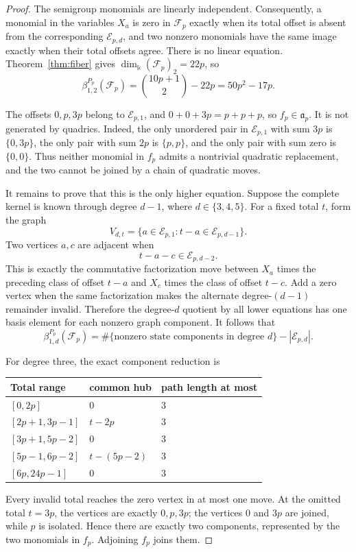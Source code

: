 \documentclass[11pt]{article}
\theoremstyle{definition}
\theoremstyle{remark}
\newcommand{\kfield}{\Bbbk}
\begin{document}
\begin{proof}
The semigroup monomials are linearly independent. Consequently, a monomial in the variables
\(X_a\) is zero in \(\mathcal F_p\) exactly when its total offset is absent from the corresponding
\(\mathcal E_{p,d}\), and two nonzero monomials have the same image exactly when their total
offsets agree. There is no linear equation. Theorem~\ref{thm:fiber} gives
\(\dim_{\kfield}(\mathcal F_p)_2=22p\), so
\begin{equation}
\beta^{P_p}_{1,2}(\mathcal F_p)
=\binom{10p+1}{2}-22p=50p^2-17p.\label{eq:quadratic-count}
\end{equation}

The offsets \(0,p,3p\) belong to \(\mathcal E_{p,1}\), and
\(0+0+3p=p+p+p\), so \(f_p\in\mathfrak a_p\). It is not generated by quadrics. Indeed, the
only unordered pair in \(\mathcal E_{p,1}\) with sum \(3p\) is \(\{0,3p\}\), the only pair with
sum \(2p\) is \(\{p,p\}\), and the only pair with sum zero is \(\{0,0\}\). Thus neither
monomial in \(f_p\) admits a nontrivial quadratic replacement, and the two cannot be joined by a
chain of quadratic moves.

It remains to prove that this is the only higher equation. Suppose the complete kernel is known
through degree \(d-1\), where \(d\in\{3,4,5\}\). For a fixed total \(t\), form the graph
\[
V_{d,t}=\{a\in\mathcal E_{p,1}:t-a\in\mathcal E_{p,d-1}\}.
\]
Two vertices \(a,c\) are adjacent when
\[
t-a-c\in\mathcal E_{p,d-2}.
\]
This is exactly the commutative factorization move between \(X_a\) times the preceding class of
offset \(t-a\) and \(X_c\) times the class of offset \(t-c\). Add a zero vertex when the same
factorization makes the alternate degree-\((d-1)\) remainder invalid. Therefore the degree-\(d\)
quotient by all lower equations has one basis element for each nonzero graph component. It follows
that
\begin{equation}
\beta^{P_p}_{1,d}(\mathcal F_p)
=\#\{\text{nonzero state components in degree }d\}-|\mathcal E_{p,d}|.
\label{eq:component-defect}
\end{equation}

For degree three, the exact component reduction is
\begin{center}
\begin{tabular}{@{}lll@{}}
\toprule
Total range & common hub & path length at most\\
\midrule
\([0,2p]\) & \(0\) & 3\\
\([2p+1,3p-1]\) & \(t-2p\) & 3\\
\([3p+1,5p-2]\) & \(0\) & 3\\
\([5p-1,6p-2]\) & \(t-(5p-2)\) & 3\\
\([6p,24p-1]\) & \(0\) & 3\\
\bottomrule
\end{tabular}
\end{center}
Every invalid total reaches the zero vertex in at most one move. At the omitted total \(t=3p\),
the vertices are exactly \(0,p,3p\); the vertices \(0\) and \(3p\) are joined, while \(p\) is
isolated. Hence there are exactly two components, represented by the two monomials in \(f_p\).
Adjoining \(f_p\) joins them.


\end{proof}
\end{document}
